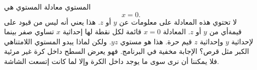 \begin{surferPage}[Plane]{المستوي}
معادلة المستوي هي \[x=0.\] لا تحتوي هذه المعادلة على معلومات عن $y$ أو $z$. هذا يعني أنه ليس من قيود على قيمةأي من $y$ أو $z$.
المعادلة $x=0$ قائمة لكل نقطة لها إحداثية $x$ تساوي صفر بينما لإحداثية $y$ وإحداثية $z$ قيم حرة. هذا هو مستوي $yz$.
\newline \newline
ولكن لماذا يبدو المستوي اللامتناهي الكبر مثل قرص؟ الإجابة مخفية في البرنامج. فهو يعرض السطح داخل كرة غير مرئية فلا يمكننا أن نرى سوى ما يوجد داخل الكرة وإلا لما كانت إتسعت الشاشة.
\end{surferPage}
